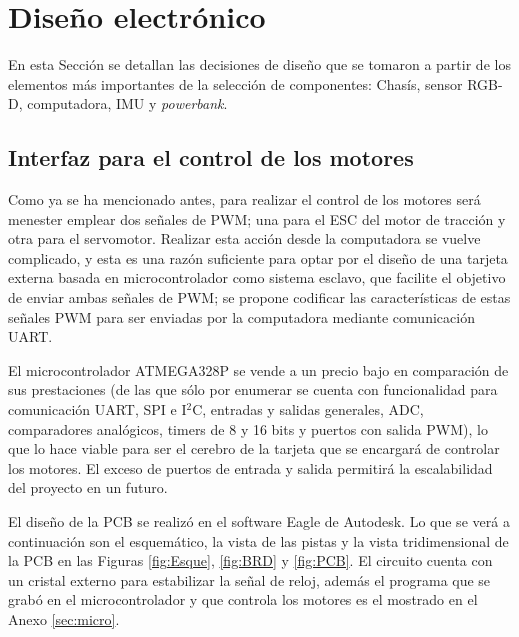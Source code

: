 \section{Diseño electrónico}
\label{sec:disel}
En esta Sección se detallan las decisiones de diseño que se tomaron a partir de los elementos más importantes de la selección de componentes: Chasís, sensor RGB-D, computadora, IMU y {\it powerbank}.
\subsection{Interfaz para el control de los motores}
\label{ssec:motcont}
Como ya se ha mencionado antes, para realizar el control de los motores será menester emplear dos señales de PWM; una para el ESC del motor de tracción y otra para el servomotor. Realizar esta acción desde la computadora se vuelve complicado, y esta es una razón suficiente para optar por el diseño de una tarjeta externa basada en microcontrolador como sistema esclavo, que facilite el objetivo de enviar ambas señales de PWM; se propone codificar las características de estas señales PWM para ser enviadas por la computadora mediante comunicación UART.
\par El microcontrolador ATMEGA328P se vende a un precio bajo en comparación de sus prestaciones (de las que sólo por enumerar se cuenta con funcionalidad para comunicación UART, SPI e I$^{2}$C, entradas y salidas generales, ADC, comparadores analógicos, timers de 8 y 16 bits y puertos con salida PWM), lo que lo hace viable para ser el cerebro de la tarjeta que se encargará de controlar los motores. El exceso de puertos de entrada y salida permitirá la escalabilidad del proyecto en un futuro.
\par El diseño de la PCB se realizó en el software Eagle de Autodesk. Lo que se verá a continuación son el esquemático, la vista de las pistas y la vista tridimensional de la PCB en las Figuras \ref{fig:Esque}, \ref{fig:BRD} y \ref{fig:PCB}. El circuito cuenta con un cristal externo para estabilizar la señal de reloj, además el programa que se grabó en el microcontrolador y que controla los motores es el mostrado en el Anexo \ref{sec:micro}.

